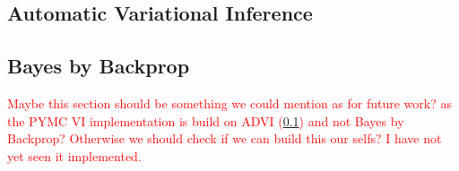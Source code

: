 \subsection{Automatic Variational Inference}\label{sec:ADVI}
\subsection{Bayes by Backprop}
\textcolor{red}{Maybe this section should be something we could mention as for future work? as the PYMC VI implementation is build on ADVI (\ref{sec:ADVI}) and not Bayes by Backprop? Otherwise we should check if we can build this our selfs? I have not yet seen it implemented.}
